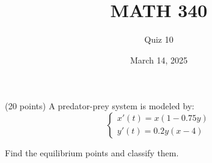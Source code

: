 \documentclass{exam}
\begin{document}
\title{MATH 340}
\author{Quiz 10}
\date{March 14, 2025}
\maketitle

(20 points) A predator-prey system is modeled by:
\[
\begin{cases}
  x'(t)=x(1-0.75y) \\
  y'(t)=0.2y(x-4)
\end{cases}
\]

Find the equilibrium points and classify them.
\end{document}
